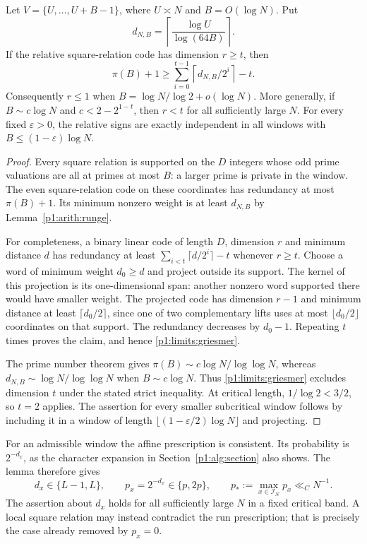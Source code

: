 \begin{lemma}
\label{p1:limits:local-rigidity}
Let $V=\{U,\ldots,U+B-1\}$, where $U\asymp N$ and $B=O(\log N)$.
Put
\[
 d_{N,B}=\left\lceil\frac{\log U}{\log(64B)}\right\rceil.
\]
If the relative square-relation code has dimension $r\ge t$, then
\begin{equation}
 \pi(B)+1\ge
 \sum_{i=0}^{t-1}\left\lceil d_{N,B}/2^i\right\rceil-t.
 \label{p1:limits:griesmer}
\end{equation}
Consequently $r\le1$ when $B=\log N/\log2+o(\log N)$.
More generally, if $B\sim c\log N$ and
$c<2-2^{1-t}$, then $r<t$ for all sufficiently large $N$.
For every fixed $\varepsilon>0$, the relative signs are exactly
independent in all windows with $B\le(1-\varepsilon)\log N$.
\end{lemma}
\begin{proof}
Every square relation is supported on the $D$ integers whose odd
prime valuations are all at primes at most $B$: a larger prime is
private in the window.  The even square-relation code on these
coordinates has redundancy at most $\pi(B)+1$.  Its minimum nonzero
weight is at least $d_{N,B}$ by Lemma~\ref{p1:arith:runge}.

For completeness, a binary linear code of length $D$, dimension $r$
and minimum distance $d$ has redundancy at least
$\sum_{i<t}\lceil d/2^i\rceil-t$ whenever $r\ge t$.
Choose a word of minimum weight $d_0\ge d$ and project outside its
support.  The kernel of this projection is its one-dimensional span:
another nonzero word supported there would have smaller weight.
The projected code has dimension $r-1$ and minimum distance at least
$\lceil d_0/2\rceil$, since one of two complementary lifts uses at
most $\lfloor d_0/2\rfloor$ coordinates on that support.  The
redundancy decreases by $d_0-1$.  Repeating $t$ times proves the
claim, and hence \eqref{p1:limits:griesmer}.

The prime number theorem gives
$\pi(B)\sim c\log N/\log\log N$, whereas
$d_{N,B}\sim\log N/\log\log N$ when $B\sim c\log N$.
Thus \eqref{p1:limits:griesmer} excludes dimension $t$ under the
stated strict inequality.  At critical length, $1/\log2<3/2$,
so $t=2$ applies.  The assertion for every smaller subcritical
window follows by including it in a window of length
$\lfloor(1-\varepsilon/2)\log N\rfloor$ and projecting.
\end{proof}

For an admissible window the affine prescription is consistent. Its
probability is $2^{-d_x}$, as the character expansion in
Section~\ref{p1:alg:section} also shows. The lemma therefore gives
\begin{equation}
 d_x\in\{L-1,L\},\qquad p_x=2^{-d_x}\in\{p,2p\},
 \qquad p_*:=\max_{x\in\mathcal I_N}p_x\ll_C N^{-1}.
 \label{p13:exact:marginals}
\end{equation}
The assertion about \(d_x\) holds for all sufficiently large \(N\)
in a fixed critical band. A local square relation may instead
contradict the run prescription; that is precisely the case
already removed by \(p_x=0\).

